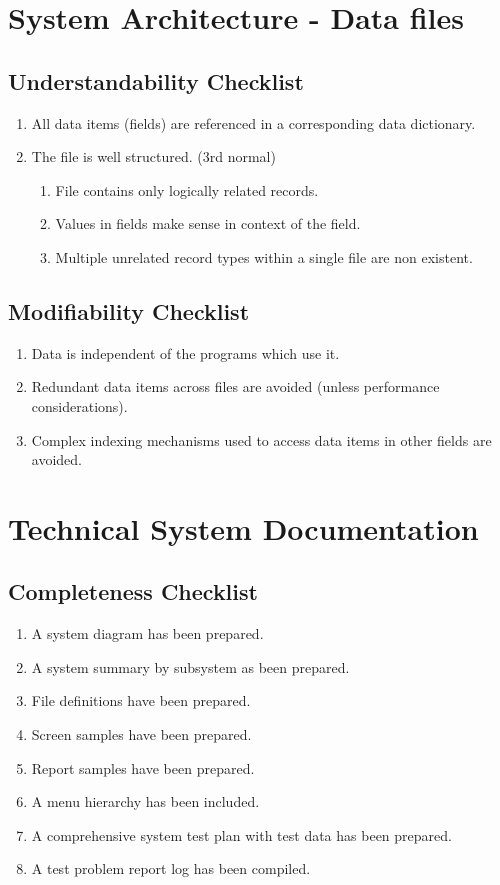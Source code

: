\chapter{System Architecture - Data files}
 \section {Understandability Checklist}
 \begin{enumerate}
  \item All data items (fields) are referenced in a corresponding data
    dictionary.
  \item The file is well structured. (3rd normal)
  \begin{enumerate}
   \item File contains only logically related records.
   \item Values in fields make sense in context of the field.
   \item Multiple unrelated record types within a single file are non existent.
  \end{enumerate}
 \end{enumerate}
 \section {Modifiability Checklist}
 \begin{enumerate}
  \item Data is independent of the programs which use it.
  \item Redundant data items across files are avoided (unless
    performance considerations).
  \item Complex indexing mechanisms used to access data items in
    other fields are avoided.
 \end{enumerate}
\chapter{Technical System Documentation}
 \section {Completeness Checklist}
 \begin{enumerate}
  \item A system diagram has been prepared.
  \item A system summary by subsystem as been prepared.
  \item File definitions have been prepared.
  \item Screen samples have been prepared.
  \item Report samples have been prepared.
  \item A menu hierarchy has been included.
  \item A comprehensive system test plan with test data has been prepared.
  \item A test problem report log has been compiled.
 \end{enumerate}
